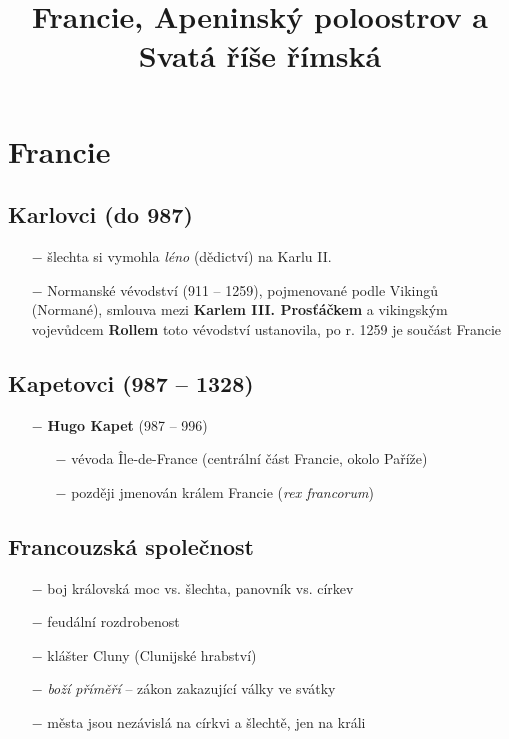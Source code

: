 \documentclass{article}
\title{\vspace{-2cm}Francie, Apeninský poloostrov a Svatá říše římská\vspace{-1.7cm}}
\date{}
\begin{document}
\maketitle
\section*{Francie}
\begin{minipage}{0.6\textwidth}
    \subsection*{Karlovci (do 987)}
    \begin{itemize}
        \vspace{-0.5em}
        \setlength\itemsep{0.15em}
        \item[$-$] šlechta si vymohla \textit{léno} (dědictví) na Karlu II.
        \item[$-$] Normanské vévodství (911 -- 1259), pojmenované podle Vikingů (Normané), smlouva mezi \textbf{Karlem III. Prosťáčkem} a vikingským vojevůdcem \textbf{Rollem} toto vévodství ustanovila, po r. 1259 je součást Francie
    \end{itemize}

    \subsection*{Kapetovci (987 -- 1328)}
    \begin{itemize}
        \vspace{-0.5em}
        \setlength\itemsep{0.15em}
        \item[$-$] \textbf{Hugo Kapet} (987 -- 996)
            \begin{itemize}
                \vspace{-0.5em}
                \setlength\itemsep{0.15em}
                \item[$-$] vévoda Île-de-France (centrální část Francie, okolo Paříže)
                \item[$-$] později jmenován králem Francie (\textit{rex francorum})
            \end{itemize}
    \end{itemize}

    \subsection*{Francouzská společnost}
    \begin{itemize}
        \vspace{-0.5em}
        \setlength\itemsep{0.15em}
        \item[$-$] boj královská moc vs. šlechta, panovník vs. církev
        \item[$-$] feudální rozdrobenost
        \item[$-$] klášter Cluny (Clunijské hrabství)
        \item[$-$] \textit{boží příměří} -- zákon zakazující války ve svátky
        \item[$-$] města jsou nezávislá na církvi a šlechtě, jen na králi
    \end{itemize}
\end{minipage}
\end{document}
